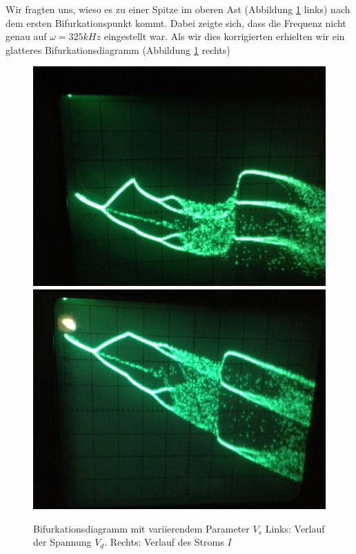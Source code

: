 \documentclass[11,5pt, twoside]{article}
\begin{document}
Wir fragten uns, wieso es zu einer Spitze im oberen Ast (Abbildung \ref{fig:ldr-bifurc} links) nach dem ersten Bifurkationspunkt kommt. Dabei zeigte sich, dass die Frequenz nicht genau auf $\omega=325kHz$ eingestellt war. Als wir dies korrigierten erhielten wir ein glatteres Bifurkationsdiagramm (Abbildung \ref{fig:ldr-bifurc} rechts)

\begin{figure}[!htbp]
\centering
\includegraphics[scale=0.18]{bif-ldr/bifurc-bad}
\includegraphics[scale=0.18]{bif-ldr/bifurc-good}
\caption{Bifurkationsdiagramm mit variierendem Parameter $V_s$ Links: Verlauf der Spannung $V_d$. Rechts: Verlauf des Stroms $I$}
\label{fig:ldr-bifurc}
\end{figure}
\end{document}
